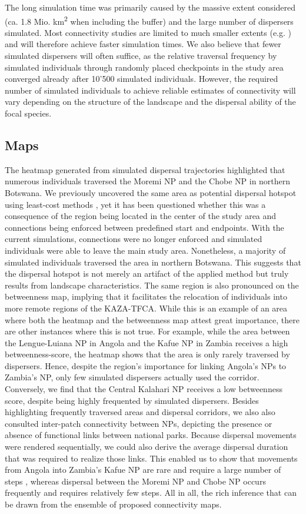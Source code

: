 \documentclass[abstract=on,10pt,a4paper,bibliography=totocnumbered]{article}
\begin{document}
 The
long simulation time was primarily caused by the massive extent considered (ca.
1.8 Mio. km\textsuperscript{2} when including the buffer) and the large number
of dispersers simulated. Most connectivity studies are limited to much smaller
extents (e.g. \citealp{Kanagaraj.2013, Clark.2015, McClure.2016, Abrahms.2017,
Zeller.2020}) and will therefore achieve faster simulation times. We also
believe that fewer simulated dispersers will often suffice, as the relative
traversal frequency by simulated individuals through randomly placed checkpoints
in the study area converged already after 10'500 simulated individuals. However,
the required number of simulated individuals to achieve reliable estimates of
connectivity will vary depending on the structure of the landscape and the
dispersal ability of the focal species.

\subsection{Maps}
The heatmap generated from simulated dispersal trajectories highlighted that
numerous individuals traversed the Moremi NP and the Chobe NP in northern
Botswana. We previously uncovered the same area as potential dispersal hotspot
using least-cost methods \citep{Hofmann.2021}, yet it has been questioned
whether this was a consequence of the region being located in the center of the
study area and connections being enforced between predefined start and
endpoints. With the current simulations, connections were no longer enforced and
simulated individuals were able to leave the main study area. Nonetheless, a
majority of simulated individuals traversed the area in northern Botswana. This
suggests that the dispersal hotspot is not merely an artifact of the applied
method but truly results from landscape characteristics. The same region is also
pronounced on the betweenness map, implying that it facilitates the relocation
of individuals into more remote regions of the KAZA-TFCA. While this is an
example of an area where both the heatmap and the betweenness map attest great
importance, there are other instances where this is not true. For example, while
the area between the Lengue-Luiana NP in Angola and the Kafue NP in Zambia
receives a high betweenness-score, the heatmap shows that the area is only
rarely traversed by dispersers. Hence, despite the region's importance for
linking Angola's NPs to Zambia's NP, only few simulated dispersers actually used
the corridor. Conversely, we find that the Central Kalahari NP receives a low
betweenness score, despite being highly frequented by simulated dispersers.
Besides highlighting frequently traversed areas and dispersal corridors, we also
also consulted inter-patch connectivity between NPs, depicting the presence or
absence of functional links between national parks. Because dispersal movements
were rendered sequentially, we could also derive the average dispersal duration
that was required to realize those links. This enabled us to show that movements
from Angola into Zambia's Kafue NP are rare and require a large number of steps
, whereas dispersal between the Moremi NP and Chobe NP occurs frequently and
requires relatively few steps. All in all, the rich inference that can be drawn
from the ensemble of proposed connectivity maps.
\end{document}
